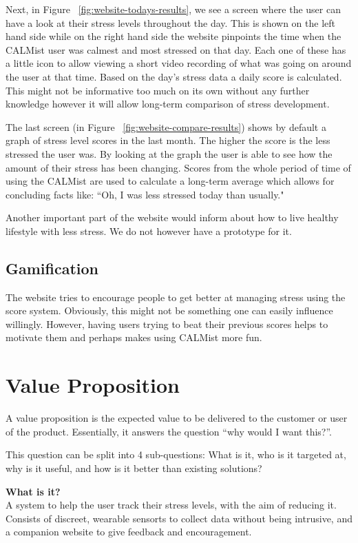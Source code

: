 \documentclass{scrartcl}
\begin{document}
Next, in Figure ~\ref{fig:website-todays-results}, we see a screen where the user can have a look at their stress levels throughout the day. This is shown on the left hand side while on the right hand side the website pinpoints the time when the CALMist user was calmest and most stressed on that day. Each one of these has a little icon to allow viewing a short video recording of what was going on around the user at that time. Based on the day's stress data a daily score is calculated. This might not be informative too much on its own without any further knowledge however it will allow long-term comparison of stress development.

The last screen (in Figure ~\ref{fig:website-compare-results}) shows by default a graph of stress level scores in the last month. The higher the score is the less stressed the user was. By looking at the graph the user is able to see how the amount of their stress has been changing. Scores from the whole period of time of using the CALMist are used to calculate a long-term average which allows for concluding facts like: ``Oh, I was less stressed today than usually."

Another important part of the website would inform about how to live healthy lifestyle with less stress. We do not however have a prototype for it.

\subsection{Gamification}

The website tries to encourage people to get better at managing stress using the score system. Obviously, this might not be something one can easily influence willingly. However, having users trying to beat their previous scores helps to motivate them and perhaps makes using CALMist more fun.

\section{Value Proposition}
A value proposition is the expected value to be delivered to the customer or user of the product. Essentially, it answers the
question ``why would I want this?''.

This question can be split into 4 sub-questions: What is it, who is it targeted at, why is it useful, and how is it better than
existing solutions?

\textbf{What is it?}\\
A system to help the user track their stress levels, with the aim of reducing it. Consists of discreet, wearable sensorts to collect
data without being intrusive, and a companion website to give feedback and encouragement.
\end{document}
